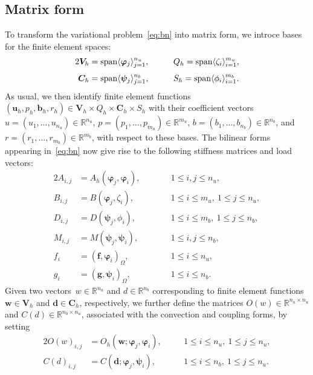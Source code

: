 \documentclass{siamltex}
\newcommand{\uu}[1]{\boldsymbol #1}                     %
\begin{document}
\subsection{Matrix form}
\label{sec:bases}

To transform the variational problem~\eqref{eq:bn} into matrix form,
we introce bases for the finite element spaces:
\begin{alignat}2
\label{eq:bases1}
\uu{V}_h & = {\rm span}\langle  \uu{\varphi}_j \rangle _{j=1}^{n_u}, & \qquad &
Q_h  = {\rm span} \langle  \zeta_i \rangle _{i=1}^{m_u},\\[0.1cm]
 \uu{C}_h& ={\rm span}\langle \uu{\psi}_j \rangle _{j=1}^{n_b}, & \qquad & S_h = {\rm span} \langle \phi_i
\rangle_{i=1}^{m_b}.
\end{alignat}
As usual, we then identify finite element functions $(\uu{u}_h, p_h,\uu{b}_h, r_h)\in \uu{V}_h \times Q_h\times \uu{C}_h \times  S_h$ with their coefficient vectors $u = (u_1, \ldots , u_{n_u}) \in \mathbb{R}^{n_u}$, $p = (p_1, \ldots , p_{m_u}) \in \mathbb{R}^{m_u}$,
$b = (b_1, \ldots , b_{n_b}) \in \mathbb{R}^{n_b}$,
and $r = (r_1, \ldots , r_{m_b}) \in \mathbb{R}^{m_b}$, with respect to these bases.
The bilinear forms appearing in~\eqref{eq:bn} now give rise to the following stiffness matrices and load vectors:
\begin{alignat*}2
A_{i,j} &= A_h(\uu{\varphi}_j,\uu{\varphi}_i), &\quad  &1 \leq i,j \leq n_u,\\[0.1cm]
B_{i,j} &= B(\uu{\varphi}_j,\zeta_i), &\quad &1 \leq i \leq m_u, \ 1 \leq j \leq n_u,\\[.1cm]
D_{i,j} &= D(\uu{\psi}_j,\phi_i),  & & 1 \leq i \leq m_b,\ 1 \leq j \leq n_b,\\[.1cm]
M_{i,j}&= M(\uu{\psi}_j,\uu{\psi}_i), &\qquad & 1 \leq i,j \leq n_b,\\[.1cm]
f_i &= (\uu{f},\uu{\varphi}_i)_\Omega, & & 1\leq i\leq n_u,\\[.1cm]
g_i &= (\uu{g},\uu{\psi}_i)_\Omega, & & 1\leq i \leq n_b.
\end{alignat*}
Given two vectors~$w\in\mathbb{R}^{n_u}$ and $d\in\mathbb{R}^{n_b}$ corresponding to finite element functions $\uu{w}\in \uu{V}_h$ and $\uu{d}\in\uu{C}_h$, respectively,
we further define the matrices $O(w)\in\mathbb{R}^{n_u\times n_u}$ and $C(d)\in\mathbb{R}^{n_b\times n_u}$, associated with the convection and coupling forms,
by setting
\begin{alignat*}2
O(w)_{i,j} &=O_h(\uu{w};\uu{\varphi}_j,\uu{\varphi}_i), &\quad  &1 \leq i \leq n_u, \ 1 \leq j \leq n_u,\\[.1cm]
C(d)_{i,j} &= C(\uu{d};\uu{\varphi}_j,\uu{\psi}_i), & & 1\leq i \leq n_b,\ 1 \leq j \leq n_u.
\end{alignat*}
\end{document}
